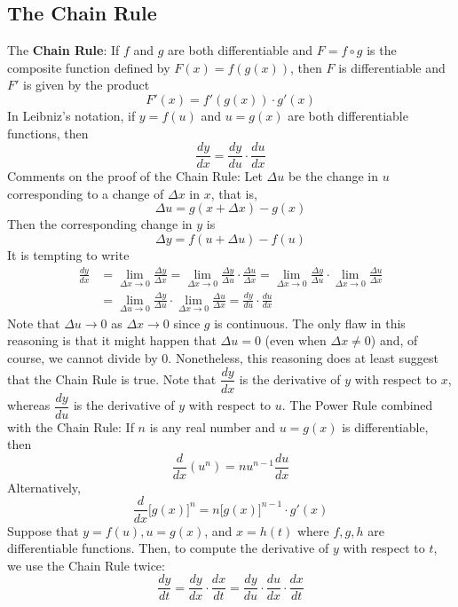 \subsection{The Chain Rule}

The \textbf{Chain Rule}: If \(f\) and \(g\) are both differentiable and
\(F=f\circ g\) is the composite function defined by \(F(x)=f(g(x))\), then
\(F\) is differentiable and \(F'\) is given by the product
\[F'(x)=f'(g(x))\cdot g'(x)\]
In Leibniz's notation, if \(y=f(u)\) and \(u=g(x)\) are both differentiable
functions, then
\[\frac{dy}{dx}=\frac{dy}{du}\cdot\frac{du}{dx}\]
Comments on the proof of the Chain Rule: Let \(\Delta u\) be the change in
\(u\) corresponding to a change of \(\Delta x\) in \(x\), that is,
\[\Delta u=g(x+\Delta x)-g(x)\]
Then the corresponding change in \(y\) is
\[\Delta y=f(u+\Delta u)-f(u)\]
It is tempting to write
\begin{align*}
    \frac{dy}{dx} &= \lim_{\Delta x\to 0}\frac{\Delta y}{\Delta x}
    =\lim_{\Delta x\to 0}
    \frac{\Delta y}{\Delta u}\cdot\frac{\Delta u}{\Delta x}
    =\lim_{\Delta x\to 0}\frac{\Delta y}{\Delta u}
    \cdot\lim_{\Delta x\to 0}\frac{\Delta u}{\Delta x} \\
    &= \lim_{\Delta u\to 0}\frac{\Delta y}{\Delta u}
    \cdot\lim_{\Delta x\to 0}\frac{\Delta u}{\Delta x}
    =\frac{dy}{du}\cdot\frac{du}{dx}
\end{align*}
Note that \(\Delta u\to 0\) as \(\Delta x\to 0\) since \(g\) is continuous.
The only flaw in this reasoning is that it might happen that \(\Delta u=0\)
(even when \(\Delta x\neq 0\)) and, of course, we cannot divide by 0.
Nonetheless, this reasoning does at least suggest that the Chain Rule is true.
Note that \(\dfrac{dy}{dx}\) is the derivative of \(y\) with respect to \(x\),
whereas \(\dfrac{dy}{du}\) is the derivative of \(y\) with respect to \(u\).
The Power Rule combined with the Chain Rule: If \(n\) is any real number and
\(u=g(x)\) is differentiable, then
\[\frac{d}{dx}(u^n)=nu^{n-1}\frac{du}{dx}\]
Alternatively,
\[\frac{d}{dx}\big[g(x)\big]^n=n\big[g(x)\big]^{n-1}\cdot g'(x)\]
Suppose that \(y=f(u),u=g(x)\), and \(x=h(t)\) where \(f,g,h\) are
differentiable functions.
Then, to compute the derivative of \(y\) with respect to \(t\), we use the
Chain Rule twice:
\[\frac{dy}{dt}=\frac{dy}{dx}\cdot\frac{dx}{dt}
=\frac{dy}{du}\cdot\frac{du}{dx}\cdot\frac{dx}{dt}\]

